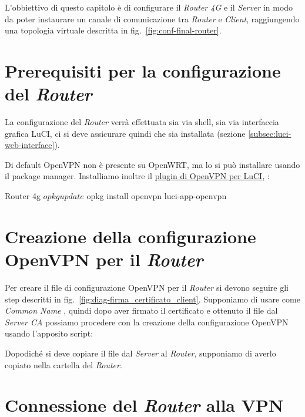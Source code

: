 L'obbiettivo di questo capitolo è di configurare il \textit{Router 4G} e il \textit{Server} in modo da poter instaurare un canale di comunicazione tra \textit{Router} e \textit{Client}, raggiungendo una topologia virtuale descritta in fig.~\ref{fig:conf-final-router}.

\section{Prerequisiti per la configurazione del \textit{Router} \ok}

La configurazione del \textit{Router} verrà effettuata sia via shell, sia via interfaccia grafica LuCI, ci si deve assicurare quindi che sia installata (sezione \ref{subsec:luci-web-interface}).

Di default OpenVPN non è presente su OpenWRT, ma lo si può installare usando il package manager. Installiamo inoltre il \href{https://openwrt.org/docs/guide-user/services/vpn/openvpn/client-luci}{plugin di OpenVPN per LuCI}, :

\begin{bashcode}{Router 4g}{}
$ opkg update
$ opkg install openvpn luci-app-openvpn
\end{bashcode}

\section{Creazione della configurazione OpenVPN per il \textit{Router} \ok}

Per creare il file di configurazione OpenVPN per il \textit{Router} si devono seguire gli step descritti in fig.~\ref{fig:diag-firma_certificato_client}. Supponiamo di usare come \textit{Common Name} , quindi dopo aver firmato il certificato e ottenuto il file  dal \textit{Server CA} possiamo procedere con la creazione della configurazione OpenVPN usando l'apposito script:


Dopodiché si deve copiare il file  dal \textit{Server} al \textit{Router}, supponiamo di averlo copiato nella cartella  del \textit{Router}. 


\section{Connessione del \textit{Router} alla VPN \ok}

